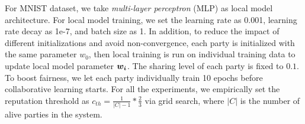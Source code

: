 \documentclass{article}
\def\vec#1{\mathchoice{\mbox{\boldmath$\displaystyle#1$}}
  {\mbox{\boldmath$\textstyle#1$}}
  {\mbox{\boldmath$\scriptstyle#1$}}
  {\mbox{\boldmath$\scriptscriptstyle#1$}}}
\newcommand{\ie}{\textit{i.e.},\xspace}
\newcommand{\nend}{\cbend}
\begin{document}



For MNIST dataset, we take \emph{multi-layer perceptron} (MLP) as local model architecture. %
For local model training, we set the learning rate as 0.001, learning rate decay as 1e-7, and batch size as 1. In addition, to reduce the impact of different initializations and avoid non-convergence, each party is initialized with the same parameter $w_0$, then local training is run on individual training data to update local model parameter $\vec{w_i}$. The sharing level of each party is fixed to $0.1$.  To %
boost fairness, we let each party individually train 10 epochs before collaborative learning starts. For all the experiments, we empirically set the reputation threshold as %
$c_{th}=\frac{1}{|C|-1}*\frac{2}{3}$ via grid search, where $|C|$ is the number of alive parties %
in the system. %

\end{document}
